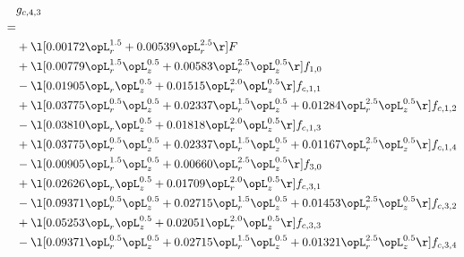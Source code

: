 \begin{alignat}{2} 
\label{eq:g_43_0} 
& g_{c,4,3} \nonumber \\ 
 = \\ 
& + \l[  0.00172 \opL_r^{1.5} +  0.00539 \opL_r^{2.5}  \r] F \nonumber \\ 
& + \l[  0.00779 \opL_r^{1.5} \opL_z^{0.5} +  0.00583 \opL_r^{2.5} \opL_z^{0.5}  \r] f_{1,0} \nonumber \\ 
& - \l[  0.01905 \opL_r \opL_z^{0.5} +  0.01515 \opL_r^{2.0} \opL_z^{0.5}  \r] f_{c,1,1} \nonumber \\ 
& + \l[  0.03775 \opL_r^{0.5} \opL_z^{0.5} +  0.02337 \opL_r^{1.5} \opL_z^{0.5} +  0.01284 \opL_r^{2.5} \opL_z^{0.5}  \r] f_{c,1,2} \nonumber \\ 
& - \l[  0.03810 \opL_r \opL_z^{0.5} +  0.01818 \opL_r^{2.0} \opL_z^{0.5}  \r] f_{c,1,3} \nonumber \\ 
& + \l[  0.03775 \opL_r^{0.5} \opL_z^{0.5} +  0.02337 \opL_r^{1.5} \opL_z^{0.5} +  0.01167 \opL_r^{2.5} \opL_z^{0.5}  \r] f_{c,1,4} \nonumber \\ 
& - \l[  0.00905 \opL_r^{1.5} \opL_z^{0.5} +  0.00660 \opL_r^{2.5} \opL_z^{0.5}  \r] f_{3,0} \nonumber \\ 
& + \l[  0.02626 \opL_r \opL_z^{0.5} +  0.01709 \opL_r^{2.0} \opL_z^{0.5}  \r] f_{c,3,1} \nonumber \\ 
& - \l[  0.09371 \opL_r^{0.5} \opL_z^{0.5} +  0.02715 \opL_r^{1.5} \opL_z^{0.5} +  0.01453 \opL_r^{2.5} \opL_z^{0.5}  \r] f_{c,3,2} \nonumber \\ 
& + \l[  0.05253 \opL_r \opL_z^{0.5} +  0.02051 \opL_r^{2.0} \opL_z^{0.5}  \r] f_{c,3,3} \nonumber \\ 
& - \l[  0.09371 \opL_r^{0.5} \opL_z^{0.5} +  0.02715 \opL_r^{1.5} \opL_z^{0.5} +  0.01321 \opL_r^{2.5} \opL_z^{0.5}  \r] f_{c,3,4} \nonumber \\ 
\end{alignat} 


